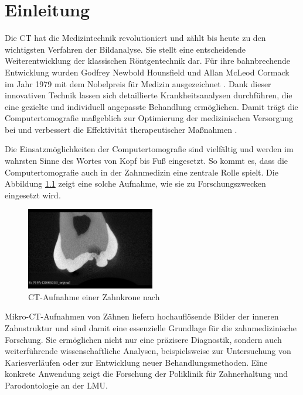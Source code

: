 \chapter{Einleitung}
\label{chap:einleitung} Die \ac{CT} hat die Medizintechnik revolutioniert und
zählt bis heute zu den wichtigsten Verfahren der Bildanalyse. Sie stellt eine entscheidende
Weiterentwicklung der klassischen Röntgentechnik dar. Für ihre bahnbrechende
Entwicklung wurden Godfrey Newbold Hounsfield und Allan McLeod Cormack im Jahr
1979 mit dem Nobelpreis für Medizin ausgezeichnet \citep[vgl.][S.~12]{handels2000}.
Dank dieser innovativen Technik lassen sich detaillierte Krankheitsanalysen
durchführen, die eine gezielte und individuell angepasste Behandlung ermöglichen.
Damit trägt die Computertomografie maßgeblich zur Optimierung der medizinischen
Versorgung bei und verbessert die Effektivität therapeutischer Maßnahmen \citep[vgl.][S.~207]{de20083d}.

Die Einsatzmöglichkeiten der Computertomografie sind vielfältig und werden im wahrsten
Sinne des Wortes von Kopf bis Fuß eingesetzt. So kommt es, dass die Computertomografie
auch in der Zahnmedizin eine zentrale Rolle spielt. Die Abbildung
\ref{fig:ct_aufnahme_eines_zahns} zeigt eine solche Aufnahme, wie sie zu Forschungszwecken
eingesetzt wird.

\begin{figure}[h]
	\centering
	\includegraphics[width=0.5\textwidth]{img/micro_ct_orginal.jpg}
	\caption{CT-Aufnahme einer Zahnkrone nach \citet{heck2024}}
	\label{fig:ct_aufnahme_eines_zahns}
\end{figure}

Mikro-\ac{CT}-Aufnahmen von Zähnen liefern hochauflösende Bilder der inneren Zahnstruktur
und sind damit eine essenzielle Grundlage für die zahnmedizinische Forschung.
Sie ermöglichen nicht nur eine präzisere Diagnostik, sondern auch weiterführende
wissenschaftliche Analysen, beispielsweise zur Untersuchung von Kariesverläufen
oder zur Entwicklung neuer Behandlungsmethoden. Eine konkrete Anwendung zeigt die
Forschung der Poliklinik für Zahnerhaltung und Parodontologie an der \ac{LMU}.

